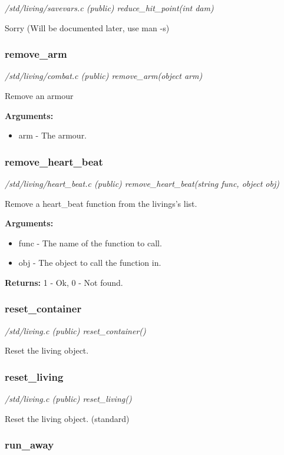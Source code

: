 {\em /std/living/savevars.c (public) reduce\_hit\_point(int dam)}

Sorry (Will be documented later, use man -s)


\subsubsection{remove\_arm}

{\em /std/living/combat.c (public) remove\_arm(object arm)}

Remove an armour

{\bf Arguments:}
\begin{itemize}
\item     arm - The armour.
\end{itemize}


\subsubsection{remove\_heart\_beat}

{\em /std/living/heart\_beat.c (public) remove\_heart\_beat(string func, object obj)}

Remove a heart\_beat function from the livings's list.

{\bf Arguments:}
\begin{itemize}
\item     func - The name of the function to call.
\item obj - The object to call the function in. 
\end{itemize}

{\bf Returns:}        1 - Ok, 0 - Not found.


\subsubsection{reset\_container}

{\em /std/living.c (public) reset\_container()}

Reset the living object. 


\subsubsection{reset\_living}

{\em /std/living.c (public) reset\_living()}

Reset the living object. (standard)


\subsubsection{run\_away}

